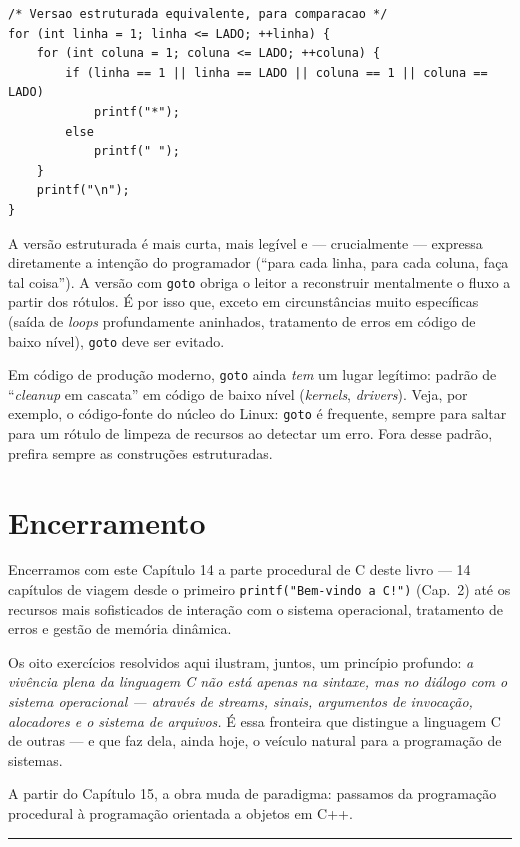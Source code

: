 \documentclass[11pt,a4paper]{article}
\begin{document}
\begin{lstlisting}[style=ccode]
/* Versao estruturada equivalente, para comparacao */
for (int linha = 1; linha <= LADO; ++linha) {
    for (int coluna = 1; coluna <= LADO; ++coluna) {
        if (linha == 1 || linha == LADO || coluna == 1 || coluna == LADO)
            printf("*");
        else
            printf(" ");
    }
    printf("\n");
}
\end{lstlisting}

A vers\~ao estruturada \'e mais curta, mais leg\'ivel e --- crucialmente --- expressa diretamente a inten\c{c}\~ao do programador (``para cada linha, para cada coluna, fa\c{c}a tal coisa''). A vers\~ao com \texttt{goto} obriga o leitor a reconstruir mentalmente o fluxo a partir dos r\'otulos. \'E por isso que, exceto em circunst\^ancias muito espec\'ificas (sa\'ida de \emph{loops} profundamente aninhados, tratamento de erros em c\'odigo de baixo n\'ivel), \texttt{goto} deve ser evitado.

\begin{boaprat}
Em c\'odigo de produ\c{c}\~ao moderno, \texttt{goto} ainda \emph{tem} um lugar leg\'itimo: padr\~ao de ``\emph{cleanup} em cascata'' em c\'odigo de baixo n\'ivel (\emph{kernels}, \emph{drivers}). Veja, por exemplo, o c\'odigo-fonte do n\'ucleo do Linux: \texttt{goto} \'e frequente, sempre para saltar para um r\'otulo de limpeza de recursos ao detectar um erro. Fora desse padr\~ao, prefira sempre as constru\c{c}\~oes estruturadas.
\end{boaprat}

\section*{Encerramento}

Encerramos com este Cap\'itulo 14 a parte procedural de C deste livro --- 14 cap\'itulos de viagem desde o primeiro \texttt{printf("Bem-vindo a C!")} (Cap.~2) at\'e os recursos mais sofisticados de intera\c{c}\~ao com o sistema operacional, tratamento de erros e gest\~ao de mem\'oria din\^amica.

Os oito exerc\'icios resolvidos aqui ilustram, juntos, um princ\'ipio profundo: \emph{a viv\^encia plena da linguagem C n\~ao est\'a apenas na sintaxe, mas no di\'alogo com o sistema operacional --- atrav\'es de \emph{streams}, sinais, argumentos de invoca\c{c}\~ao, alocadores e o sistema de arquivos.} \'E essa fronteira que distingue a linguagem C de outras --- e que faz dela, ainda hoje, o ve\'iculo natural para a programa\c{c}\~ao de sistemas.

A partir do Cap\'itulo 15, a obra muda de paradigma: passamos da programa\c{c}\~ao procedural \`a programa\c{c}\~ao orientada a objetos em C++.

\vspace{1em}
\begin{center}\rule{0.5\textwidth}{0.4pt}\end{center}
\end{document}
